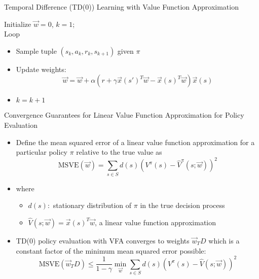 \begin{frame}[c]{Temporal Difference (TD(0)) Learning with Value
		Function Approximation}

Initialize $\vec{w}= 0$, $k=1$;\\
Loop
	\begin{itemize}
		\item Sample tuple $(s_k, a_k, r_k, s_{k+1})$ given $\pi$
		\item Update weights:
		$$ \vec{w} = \vec{w} + \alpha( r + \gamma \vec{x}(s')^T \vec{w} - \vec{x}(s)^T\vec{w}) \vec{x}(s) $$
		\item $k = k + 1$
	\end{itemize}

\end{frame}
\begin{frame}[c]{Convergence Guarantees for Linear Value Function
		Approximation for Policy Evaluation}
	
\begin{itemize}
	\item Define the mean squared error of a linear value function
	approximation for a particular policy $\pi$ relative to the true value as
	$$\text{MSVE}(\vec{w}) = \sum_{s\in S} d(s) (V^\pi(s) - \hat{V}^\pi (s;\vec{w}))^2$$
	\item where
	\begin{itemize}
		\item $d(s):$ stationary distribution of $\pi$ in the true decision process
		\item $\hat{V}(s;\vec{w}) = \vec{x}(s)^T \vec{w}$, a linear value function approximation
	\end{itemize}
	\item TD(0) policy evaluation with VFA converges to weights $\vec{w}_TD$ which is a constant factor of the minimum mean squared error possible:
	$$\text{MSVE}(\vec{w}_TD) \leq \frac{1}{1-\gamma} \min_\vec{w}\sum_{s\in S} d(s) (V^\pi(s) - \hat{V}(s;\vec{w}))^2$$
\end{itemize}

	
\end{frame}

